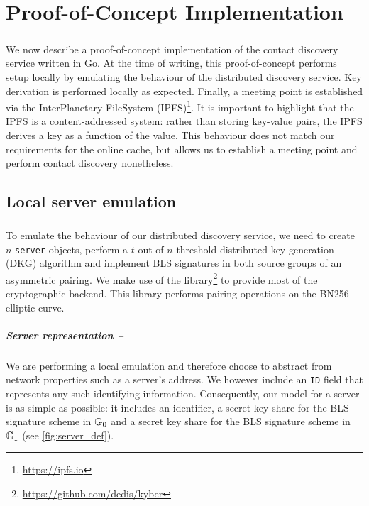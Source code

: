 \chapter{Proof-of-Concept Implementation}
\label{chap:implementation}


\paragraph{} We now describe a proof-of-concept implementation of the contact discovery service written in Go. At the time of writing, this proof-of-concept performs setup locally by emulating the behaviour of the distributed discovery service. Key derivation is performed locally as expected. Finally, a meeting point is established via the InterPlanetary FileSystem (IPFS)\footnote{\url{https://ipfs.io}}. It is important to highlight that the IPFS is a content-addressed system: rather than storing key-value pairs, the IPFS derives a key as a function of the value. This behaviour does not match our requirements for the online cache, but allows us to establish a meeting point and perform contact discovery nonetheless.




\section{Local server emulation}

	\paragraph{} To emulate the behaviour of our distributed discovery service, we need to create $n$ \texttt{server} objects, perform a $t$-out-of-$n$ threshold distributed key generation (DKG) algorithm and implement BLS signatures in both source groups of an asymmetric pairing. We make use of the \kyber \;library\footnote{\url{https://github.com/dedis/kyber}} to provide most of the cryptographic backend. This library performs pairing operations on the BN256 elliptic curve.
	
	\paragraph{Server representation --} We are performing a local emulation and therefore choose to abstract from network properties such as a server's address. We however include an \texttt{ID} field that represents any such identifying information. Consequently, our model for a server is as simple as possible: it includes an identifier, a secret key share for the BLS signature scheme in $\mathbb{G}_0$ and a secret key share for the BLS signature scheme in $\mathbb{G}_1$ (see \autoref{fig:server_def}).
	
